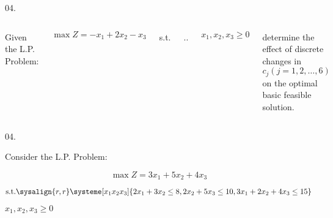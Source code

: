 \begin{frameExample}{04.}{}
  \begin{columns}
    Given the L.P. Problem:

    $\max Z = -x_1 + 2x_2 - x_3$

    
    s.t.

    \vspace{5mm}
    \sysdelim..%

    \vspace{5mm}

    $x_1,x_2,x_3 \geq 0$

    determine the effect of discrete changes in $c_j (j = 1,2,\ldots,6)$ on the optimal basic feasible solution.
  \end{columns}
\end{frameExample}

\begin{frameExample}{04.}{}

Consider the L.P. Problem:

    \[ \max Z = 3x_1 + 5x_2 + 4x_3\]
    
    \begin{equation*}
          \text{s.t.}
      \sysalign{r,r}%
    \systeme[x_1x_2x_3]%
    {
      2x_1 + 3x_2  \leq 8,
      2x_2 + 5x_3 \leq 10,
      3x_1 + 2x_2 + 4x_3 \leq 15 
    }
    \end{equation*}

    \vspace{5mm}

    $x_1,x_2,x_3 \geq 0$

\end{frameExample}


